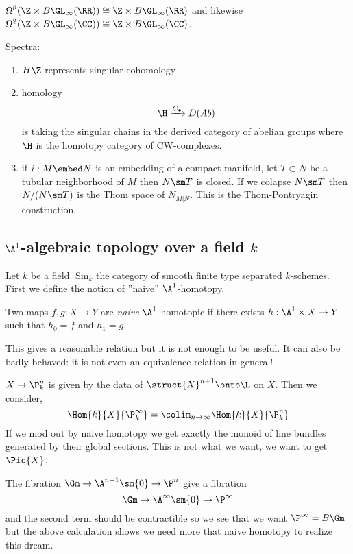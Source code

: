 \documentclass{article}
\newcommand{\Sm}{\mathrm{Sm}}
\begin{document}
\begin{theorem}[Bott]
$\Omega^8 (\Z \times B \GL_{\infty}(\RR)) \cong \Z \times B \GL_{\infty}(\RR)$ and likewise $\Omega^2 (\Z \times B \GL_{\infty}(\CC)) \cong \Z \times B \GL_{\infty}(\CC)$. 
\end{theorem}

Spectra: 
\begin{enumerate}
\item $H \Z$ represents singular cohomology
\item homology 
\[ \H \xrightarrow{C_\bullet} D(Ab) \]
is taking the singular chains in the derived category of abelian groups where $\H$ is the homotopy category of CW-complexes. 
\item if $i : M \embed N$ is an embedding of a compact manifold, let $T \subset N$ be a tubular neighborhood of $M$ then $N \sm T$ is closed. If we colapse $N \sm T$ then $N / (N \sm T)$ is the Thom space of $N_{M|N}$. This is the Thom-Pontryagin construction. 
\end{enumerate}

\subsection{$\A^1$-algebraic topology over a field $k$}

Let $k$ be a field. $\Sm_k$ the category of smooth finite type separated $k$-schemes. First we define the notion of ''naive'' $\A^1$-homotopy. 

\begin{defn}
Two maps $f, g : X \to Y$ are \textit{naive} $\A^1$-homotopic if there exists $h : \A^1 \times X \to Y$ such that $h_0 = f$ and $h_1 = g$. 
\end{defn}

This gives a reasonable relation but it is not enough to be useful. It can also be badly behaved: it is not even an equivalence relation in general!

\begin{example}
$X \to \P^n_k$ is given by the data of $\struct{X}^{n+1} \onto \L$ on $X$. Then we consider,
\[ \Hom{k}{X}{\P^\infty_k} = \colim_{n \to \infty} \Hom{k}{X}{\P^n_k} \] 
If we mod out by naive homotopy we get exactly the monoid of line bundles generated by their global sections. This is not what we want, we want to get $\Pic{X}$. 
\end{example}

\begin{example}
The fibration $\Gm \to \A^{n+1} \sm \{ 0 \} \to \P^n$ give a fibration
\[ \Gm \to \A^{\infty} \sm \{ 0 \} \to \P^\infty \]
and the second term should be contractible so we see that we want $\P^{\infty} = B \Gm$ but the above calculation shows we need more that naive homotopy to realize this dream. 
\end{example}
\end{document}
